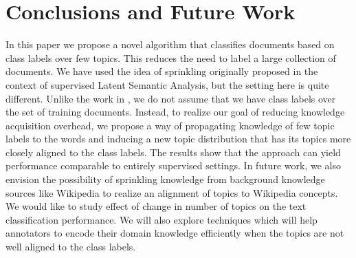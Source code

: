 \documentclass[11pt]{article}
\begin{document}
\section{Conclusions and Future Work}\label{Sec:Conclusions}
In this paper we propose a novel algorithm that classifies documents based on class labels over few topics. This reduces the need to label a large collection of documents. We have used the idea of sprinkling originally proposed in the context of supervised Latent Semantic Analysis, but the setting here is quite different. Unlike the work in \cite{DBLP:conf/ecir/ChakrabortiLWW06}, we do not assume that we have class labels over the set of training documents. Instead, to realize our goal of reducing knowledge acquisition overhead, we propose a way of propagating knowledge of few topic labels to the words and inducing a new topic distribution that has its topics more closely aligned to the class labels. The results show that the approach can yield performance comparable to entirely supervised settings. In future work, we also envision the possibility of sprinkling knowledge from background knowledge sources like Wikipedia \cite{ESA} to realize an alignment of topics to Wikipedia concepts. We would like to study effect of change in number of topics on the text classification performance. We will also explore techniques which will help annotators to encode their domain knowledge efficiently when the topics are not well aligned to the class labels.

%
\end{document}
